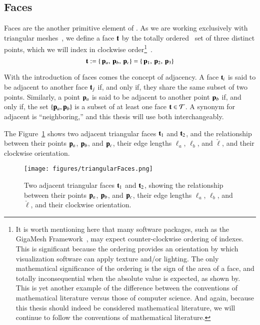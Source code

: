 \subsection{Faces}
\label{ch2s3ssF}
Faces are the another primitive element of \tdd{}. As we are working exclusively with triangular meshes~\cite[p.~26]{Mara12}, we define a face $\mathbf{t}$ by the totally ordered~\cite{Weisstein19a} set of three distinct points, which we will index in clockwise order\footnote{It is worth mentioning here that many software packages, such as the GigaMesh Framework~\cite[p.~89]{Mara12}, may expect counter-clockwise ordering of indexes.  This is significant because the ordering provides an orientation by which visualization software can apply texture and/or lighting. The only mathematical significance of the ordering is the sign of the area of a face, and totally inconsequential when the absolute value is expected, as shown by\cite[p.~2]{Braden86}. This is yet another example of the difference between the conventions of mathematical literature versus those of computer science. And again, because this thesis should indeed be considered mathematical literature, we will continue to follow the conventions of mathematical literature.}~\cite[p.~4]{Mara17}.
%
\begin{equation}
	\mathbf{t} := \left \{\,\mathbf{p}_a,\,\mathbf{p}_b,\,\mathbf{p}_c\right \} = \left \{\,\mathbf{p}_1,\,\mathbf{p}_2,\,\mathbf{p}_3\right \}
	\label{eq:defineSetOfFaces}
\end{equation}

With the introduction of faces comes the concept of adjacency. A face $\mathbf{t}_i$ is said to be adjacent to another face $\mathbf{t}_j$ if, and only if, they share the same subset of two points. Similarly, a point $\mathbf{p}_a$ is said to be adjacent to another point $\mathbf{p}_b$ if, and only if, the set $\{\mathbf{p}_a, \mathbf{p}_b\}$ is a subset of at least one face $\mathbf{t} \in \mathcal{T}$. A synonym for adjacent is ``neighboring,'' and this thesis will use both interchangeably. 

The Figure~\ref{fig:triangularFaces} shows two adjacent triangular faces $\mathbf{t}_1$ and $\mathbf{t}_2$, and the relationship between their points $\mathbf{p}_a$, $\mathbf{p}_b$, and $\mathbf{p}_c$, their edge lengths $\ell_a$, $\ell_b$, and $\check{\ell}$, and their clockwise orientation.

\begin{figure}
\ffigbox
	{\texttt{[image: figures/triangularFaces.png]}}
	{\caption[Two Triangular Faces]{Two adjacent triangular faces $\mathbf{t}_1$ and $\mathbf{t}_2$, showing the relationship between their points $\mathbf{p}_a$, $\mathbf{p}_b$, and $\mathbf{p}_c$, their edge lengths $\ell_a$, $\ell_b$, and $\check{\ell}$, and their clockwise orientation.}\label{fig:triangularFaces}}
\end{figure}

